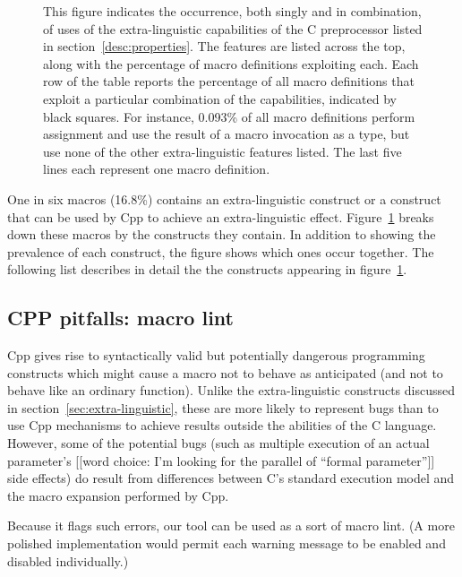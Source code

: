 \documentclass[10pt]{article}
\begin{document}
\begin{figure}
  {\small\centerline{}}
  
  \caption{This figure indicates the occurrence, both singly and in
    combination, of uses of the extra-linguistic capabilities of the C
    preprocessor listed in section~\ref{desc:properties}.  The features are
    listed across the top, along with the percentage of macro definitions
    exploiting each.  Each row of the table reports the percentage of all
    macro definitions that exploit a particular combination of the
    capabilities, indicated by black squares.  For instance, 0.093\% of all
    macro definitions perform assignment and use the result of a macro
    invocation as a type, but use none of the other extra-linguistic
    features listed.  The last five lines each represent one macro
    definition.}
  \label{fig:subset-properties}
\end{figure}

One in six macros (16.8\%) contains an extra-linguistic construct or a
construct that can be used by Cpp to achieve an extra-linguistic effect.
Figure~\ref{fig:subset-properties} breaks down these macros by the
constructs they contain.  In addition to showing the prevalence of each
construct, the figure shows which ones occur together.  The following list
describes in detail the the constructs appearing in
figure~\ref{fig:subset-properties}.

{}



\subsection{CPP pitfalls:  macro lint}
\label{sec:lint}

Cpp gives rise to syntactically valid but potentially dangerous programming
constructs which might cause a macro not to behave as anticipated (and not
to behave like an ordinary function).  Unlike the extra-linguistic
constructs discussed in section~\ref{sec:extra-linguistic}, these are more
likely to represent bugs than to use Cpp mechanisms to achieve results
outside the abilities of the C language.  However, some of the potential
bugs (such as multiple execution of an actual parameter's [[word choice:
I'm looking for the parallel of ``formal parameter'']] side effects) do
result from differences between C's standard execution model and the
macro expansion performed by Cpp.

Because it flags such errors, our tool can be used as a sort of macro lint.
(A more polished implementation would permit each warning message to be
enabled and disabled individually.)
\end{document}
